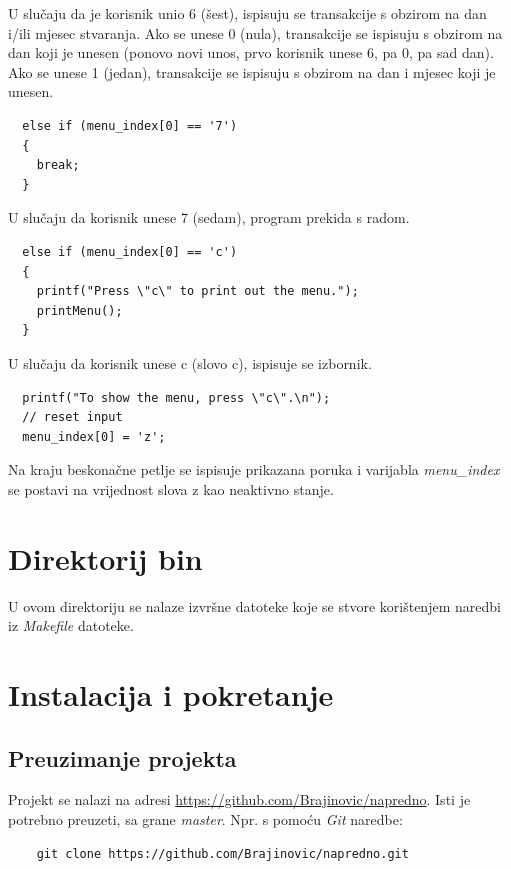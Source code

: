 \documentclass[12pt, letterpaper]{article}
\begin{document}
  U slučaju da je korisnik unio 6 (šest), ispisuju se transakcije s obzirom na dan i/ili mjesec stvaranja. Ako se unese 0 (nula), transakcije se ispisuju s obzirom na dan koji je unesen (ponovo novi unos, prvo korisnik unese 6, pa 0, pa sad dan). Ako se unese 1 (jedan), transakcije se ispisuju s obzirom na dan i mjesec koji je unesen.
  

  \begin{verbatim}
  else if (menu_index[0] == '7')
  { 
    break;
  } 
  \end{verbatim}
  U slučaju da korisnik unese 7 (sedam), program prekida s radom.

  \begin{verbatim}
  else if (menu_index[0] == 'c')
  {
    printf("Press \"c\" to print out the menu.");
    printMenu();
  }
  \end{verbatim}
  U slučaju da korisnik unese c (slovo c), ispisuje se izbornik.

  \begin{verbatim}
  printf("To show the menu, press \"c\".\n");
  // reset input
  menu_index[0] = 'z';
  \end{verbatim}
  Na kraju beskonačne petlje se ispisuje prikazana poruka i varijabla \textit{menu\_index} se postavi na vrijednost slova z kao neaktivno stanje.

  \section{Direktorij bin}
    U ovom direktoriju se nalaze izvršne datoteke koje se stvore korištenjem naredbi iz \textit{Makefile} datoteke.

  \section{Instalacija i pokretanje}

  \subsection{Preuzimanje projekta}
  Projekt se nalazi na adresi \href{https://github.com/Brajinovic/napredno}{https://github.com/Brajinovic/napredno}. Isti je potrebno preuzeti, sa grane \textit{master}. Npr. s pomoću \textit{Git} naredbe: 
    
  \begin{verbatim}
    git clone https://github.com/Brajinovic/napredno.git
  \end{verbatim}
\end{document}
